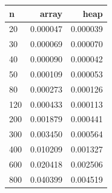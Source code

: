 \begin{tabular}{lrr}
\hline
n & array & heap \\
\hline
20 & 0.000047 & 0.000039 \\
30 & 0.000069 & 0.000070 \\
40 & 0.000090 & 0.000042 \\
50 & 0.000109 & 0.000053 \\
80 & 0.000273 & 0.000126 \\
120 & 0.000433 & 0.000113 \\
200 & 0.001879 & 0.000441 \\
300 & 0.003450 & 0.000564 \\
400 & 0.010209 & 0.001327 \\
600 & 0.020418 & 0.002506 \\
800 & 0.040399 & 0.004519 \\
\hline
\end{tabular}
